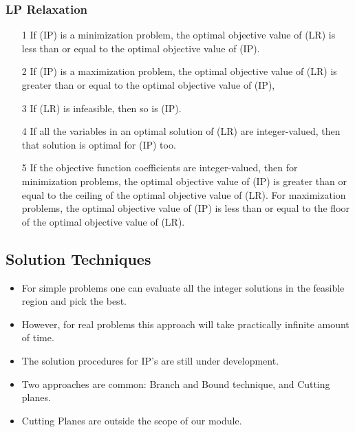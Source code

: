\documentclass{beamer}
\begin{document}
\begin{frame}
	\frametitle{LP Relaxation}
\begin{itemize}
\item[1] If (IP) is a minimization problem, the optimal objective value of (LR) is
less than or equal to the optimal objective value of (IP).
\item[2] If (IP) is a maximization problem, the optimal objective value of (LR) is
greater than or equal to the optimal objective value of (IP),
\item[3] If (LR) is infeasible, then so is (IP).
\item[4] If all the variables in an optimal solution of (LR) are integer-valued, then
that solution is optimal for (IP) too.
\end{itemize}
\end{frame}
\begin{frame} 
\begin{itemize}
\item[5] If the objective function coefficients are integer-valued, then for minimization
	problems, the optimal objective value of (IP) is greater than
	or equal to the ceiling of the optimal objective value of (LR). For maximization
	problems, the optimal objective value of (IP) is less than or
	equal to the floor of the optimal objective value of (LR). 
\end{itemize}
\end{frame}
\subsection{Solution Techniques}
\begin{frame}
\begin{itemize}
\item For simple problems one
	can evaluate all the integer solutions in the feasible region and pick the best. 
\item However, for real problems
	this approach will take practically infinite amount of time. 
\item The solution procedures for IP’s are still under
	development. 
\item Two approaches are common: Branch and Bound technique, and Cutting planes. 
\item Cutting Planes are outside the scope of our module.
\end{itemize}

\end{frame}
\end{document}
